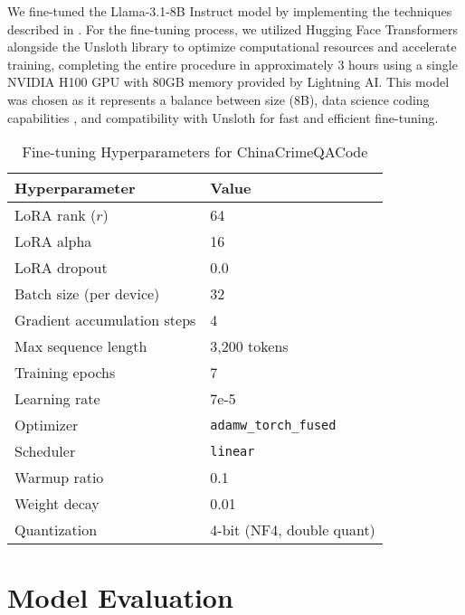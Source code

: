 We fine-tuned the Llama-3.1-8B Instruct model \citep{Grattafiori2024Llama3, Unsloth2024WhatModel} by implementing the techniques described in \cite{Pareja2024RecipesSFT}. For the fine-tuning process, we utilized Hugging Face Transformers alongside the Unsloth library to optimize computational resources and accelerate training, completing the entire procedure in approximately 3 hours using a single NVIDIA H100 GPU with 80GB memory provided by Lightning AI. This model was chosen as it represents a balance between size (8B), data science coding capabilities \citep{Lai2022DS1000}, and compatibility with Unsloth for fast and efficient fine-tuning.

\begin{table}[H]
\centering
\caption{Fine-tuning Hyperparameters for ChinaCrimeQACode}
\label{tab:hyperparameters}
\begin{tabular}{ll}
\toprule
\textbf{Hyperparameter} & \textbf{Value} \\
\midrule
LoRA rank ($r$) & 64 \\
LoRA alpha & 16 \\
LoRA dropout & 0.0 \\
Batch size (per device) & 32 \\
Gradient accumulation steps & 4 \\
Max sequence length & 3,200 tokens \\
Training epochs & 7 \\
Learning rate & 7e-5 \\
Optimizer & \texttt{adamw\_torch\_fused} \\
Scheduler & \texttt{linear} \\
Warmup ratio & 0.1 \\
Weight decay & 0.01 \\
Quantization & 4-bit (NF4, double quant) \\
\bottomrule
\end{tabular}
\end{table}

\section{Model Evaluation}

